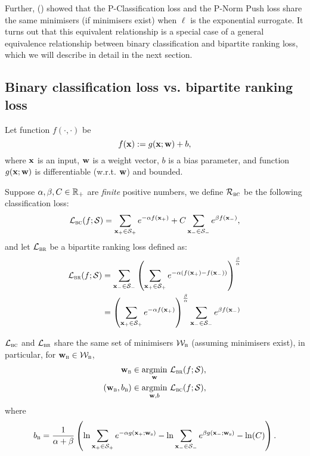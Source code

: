 Further, (\cite{ertekin2011equivalence}) showed that the P-Classification loss and the P-Norm Push loss share the same minimisers
(if minimisers exist) when $\ell$ is the exponential surrogate.
It turns out that this equivalent relationship is a special case of a general equivalence relationship 
between binary classification and bipartite ranking loss, which we will describe in detail in the next section.



\subsection{Binary classification loss vs. bipartite ranking loss}

Let function $f(\cdot, \cdot)$ be
$$
f(\mathbf{x}) := g(\mathbf{x}; \mathbf{w}) + b,
$$
where $\mathbf{x}$ is an input, $\mathbf{w}$ is a weight vector, $b$ is a bias parameter, 
and function $g(\mathbf{x}; \mathbf{w})$ is differentiable (w.r.t. $\mathbf{w}$) and bounded.

Suppose $\alpha, \beta, C \in \mathbb{R}_+$ are \emph{finite} positive numbers, we define 
$\mathcal{R}_\textsc{bc}$ be the following classification loss:
\begin{equation*}
\mathcal{L}_\textsc{bc}(f; \mathcal{S})
= \displaystyle 
    \sum_{\mathbf{x}_+ \in \mathcal{S}_+} e^{-\alpha f(\mathbf{x}_+)} +
  C \sum_{\mathbf{x}_- \in \mathcal{S}_-} e^{ \beta  f(\mathbf{x}_-)},
\end{equation*}
and let
$\mathcal{L}_\textsc{br}$ be a bipartite ranking loss defined as:
\begin{equation*}
\begin{aligned}
\mathcal{L}_\textsc{br}(f; \mathcal{S})
&= \displaystyle 
   \sum_{\mathbf{x}_- \in \mathcal{S}_-} \left( \sum_{\mathbf{x}_+ \in \mathcal{S}_+} e^{-\alpha (f(\mathbf{x}_+) - f(\mathbf{x}_-))} \right)^\frac{\beta}{\alpha} \\
&= \left( \sum_{\mathbf{x}_+ \in \mathcal{S}_+} e^{-\alpha f(\mathbf{x}_+)} \right)^\frac{\beta}{\alpha}
   \sum_{\mathbf{x}_- \in \mathcal{S}_-} e^{ \beta f(\mathbf{x}_-)}
\end{aligned}
\end{equation*}


\begin{theorem}
\label{th:bc=br}
$\mathcal{L}_\textsc{bc}$ and $\mathcal{L}_\textsc{br}$ share the same set of minimisers $\mathcal{W}_\textsc{b}$
(assuming minimisers exist), in particular, for $\mathbf{w}_\textsc{b} \in \mathcal{W}_\textsc{b}$,
\begin{equation*}
\begin{aligned}
                \mathbf{w}_\textsc{b} & \in \operatorname*{argmin}_{\mathbf{w}}     \, \mathcal{L}_\textsc{br}(f; \mathcal{S}), \\
(\mathbf{w}_\textsc{b}, b_\textsc{b}) & \in \operatorname*{argmin}_{\mathbf{w},b} \, \mathcal{L}_\textsc{bc}(f; \mathcal{S}),
\end{aligned}
\end{equation*}
where
$$
\displaystyle
b_\textsc{b} 
= \frac{1}{\alpha + \beta} \left( 
  \ln \sum_{\mathbf{x}_+ \in \mathcal{S}_+} e^{-\alpha g(\mathbf{x}_+; \mathbf{w}_\textsc{b})} -
  \ln \sum_{\mathbf{x}_- \in \mathcal{S}_-} e^{  \beta g(\mathbf{x}_-; \mathbf{w}_\textsc{b})} - \ln(C) \right).
$$
\end{theorem}

